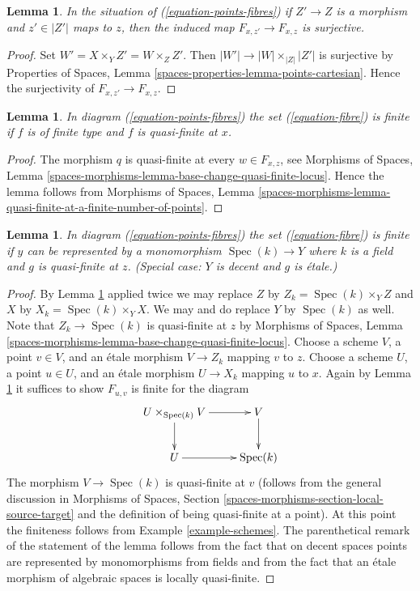 \documentclass{stacks-project}
\theoremstyle{plain}
\newtheorem{lemma}[subsection]{Lemma}
\theoremstyle{definition}
\theoremstyle{remark}
\numberwithin{equation}{subsection}
\def\Spec{\mathop{\mathrm{Spec}}}
\begin{document}
\begin{lemma}
\label{lemma-surjective-on-fibres}
In the situation of (\ref{equation-points-fibres}) if $Z' \to Z$
is a morphism and $z' \in |Z'|$ maps to $z$, then the induced map
$F_{x, z'} \to F_{x, z}$ is surjective.
\end{lemma}

\begin{proof}
Set $W' = X \times_Y Z' = W \times_Z Z'$. Then
$|W'| \to |W| \times_{|Z|} |Z'|$ is surjective by
Properties of Spaces, Lemma \ref{spaces-properties-lemma-points-cartesian}.
Hence the surjectivity of $F_{x, z'} \to F_{x, z}$.
\end{proof}

\begin{lemma}
\label{lemma-qf-and-qc-finite-fibre}
In diagram (\ref{equation-points-fibres}) the set (\ref{equation-fibre})
is finite if $f$ is of finite type and $f$ is quasi-finite at $x$.
\end{lemma}

\begin{proof}
The morphism $q$ is quasi-finite at every $w \in F_{x, z}$, see
Morphisms of Spaces, Lemma
\ref{spaces-morphisms-lemma-base-change-quasi-finite-locus}.
Hence the lemma follows from
Morphisms of Spaces, Lemma
\ref{spaces-morphisms-lemma-quasi-finite-at-a-finite-number-of-points}.
\end{proof}

\begin{lemma}
\label{lemma-decent-finite-fibre}
In diagram (\ref{equation-points-fibres}) the set (\ref{equation-fibre})
is finite if $y$ can be represented by a monomorphism $\Spec(k) \to Y$
where $k$ is a field and $g$ is quasi-finite at $z$.
(Special case: $Y$ is decent and $g$ is \'etale.)
\end{lemma}

\begin{proof}
By Lemma \ref{lemma-surjective-on-fibres} applied twice
we may replace $Z$ by $Z_k = \Spec(k) \times_Y Z$ and
$X$ by $X_k = \Spec(k) \times_Y X$. We may and do
replace $Y$ by $\Spec(k)$ as well. Note that $Z_k \to \Spec(k)$
is quasi-finite at $z$ by Morphisms of Spaces, Lemma
\ref{spaces-morphisms-lemma-base-change-quasi-finite-locus}.
Choose a scheme $V$, a point $v \in V$, and an \'etale morphism
$V \to Z_k$ mapping $v$ to $z$. Choose a scheme $U$, a point $u \in U$,
and an \'etale morphism $U \to X_k$ mapping $u$ to $x$.
Again by Lemma \ref{lemma-surjective-on-fibres}
it suffices to show $F_{u, v}$ is finite for the diagram
$$
\xymatrix{
U \times_{\Spec(k)} V \ar[r] \ar[d] & V \ar[d] \\
U \ar[r] & \Spec(k)
}
$$
The morphism $V \to \Spec(k)$ is quasi-finite at $v$
(follows from the general discussion in
Morphisms of Spaces, Section \ref{spaces-morphisms-section-local-source-target}
and the definition of being quasi-finite at a point).
At this point the finiteness follows from Example \ref{example-schemes}.
The parenthetical remark of the statement of the lemma follows
from the fact that on decent spaces points are represented by
monomorphisms from fields and from the fact that an \'etale
morphism of algebraic spaces is locally quasi-finite.
\end{proof}
\end{document}
